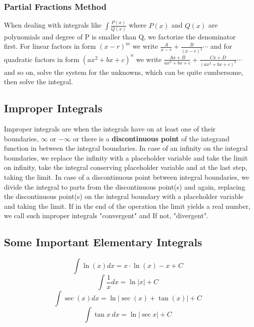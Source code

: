 \documentclass[12pt]{article}
\begin{document}
\subsubsection{Partial Fractions Method}
When dealing with integrals like $\displaystyle{\int \frac{P(x)}{Q(x)}}$ where $P(x)$ and $Q(x)$ are polynomials and degree of P is smaller than Q, we factorize the denominator first. For linear factors in form $(x-r)^m$ we write $\displaystyle{\frac{A}{x-r} +\frac{B}{(x-r)^2} \cdots}$ and for quadratic factors in form $(ax^2+bx+c)^n$ we write $\displaystyle{\frac{Ax+B}{ax^2+bx+c} +\frac{Cx+D}{(ax^2+bx+c)^2} \cdots}$ and so on, solve the system for the unknowns, which can be quite cumbersome, then solve the integral. 
\newpage
\subsection{Improper Integrals}
Improper integrals are when the integrals have on at least one of their boundaries, $\infty $ or $-\infty $ or there is a \textbf{discontinuous point} of the integrand function in between the integral boundaries. In case of an infinity on the integral boundaries, we replace the infinity with a placeholder variable and take the limit on infinity, take the integral conserving placeholder variable and at the last step, taking the limit. In case of a discontinuous point between integral boundaries, we divide the integral to parts from the discontinuous point(s) and again, replacing the discontinuous point(s) on the integral boundary with a placeholder variable and taking the limit. If in the end of the operation the limit yields a real number, we call such improper integrals "convergent" and If not, "divergent".
\subsection{Some Important Elementary Integrals}
$$\int \ln (x)dx=x\cdot \ln (x)-x+C$$
$$\int \frac{1}{x}dx=\ln |x| +C$$
$$\int \sec (x)dx=\ln \left|\sec (x)+\tan (x)\right| +C$$
$$\int \tan x\ dx=\ln |\sec x| +C$$
\newpage
\end{document}
